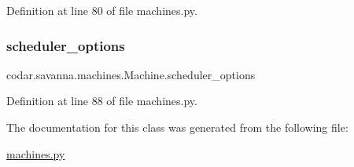 Definition at line 80 of file machines.\+py.

\mbox{\label{classcodar_1_1savanna_1_1machines_1_1_machine_aa26c50a13e89160894eff5a7fb180ed7}} 
\subsubsection{\texorpdfstring{scheduler\+\_\+options}{scheduler\_options}}
{\footnotesize\ttfamily codar.\+savanna.\+machines.\+Machine.\+scheduler\+\_\+options}



Definition at line 88 of file machines.\+py.



The documentation for this class was generated from the following file\+:\begin{DoxyCompactItemize}
\item 
\hyperlink{machines_8py}{machines.\+py}\end{DoxyCompactItemize}
